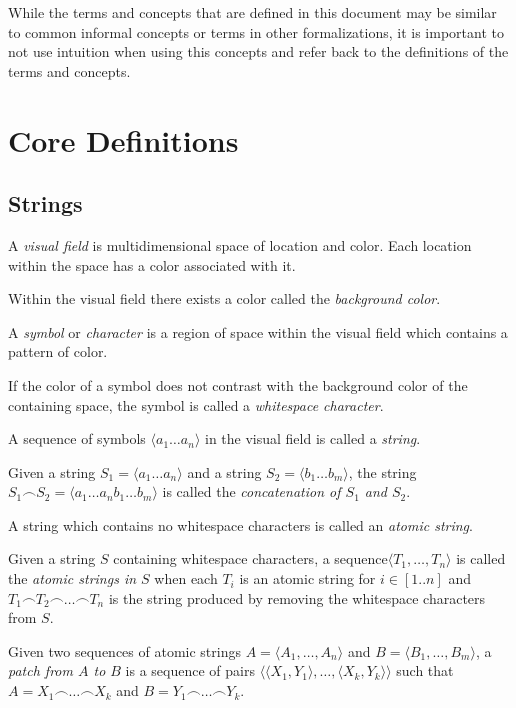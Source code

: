 \documentclass{article}
\newcommand{\nl}{\bigskip\noindent}
\newcommand{\seq}[1]{\langle #1\rangle}
\newcommand{\defcon}[1]{\emph{#1}}
\newcommand{\seqcat}{\frown}
\begin{document}
\nl While the terms and concepts that are defined in this document may be similar to common informal concepts or terms in other formalizations, it is important to not use intuition when using this concepts and refer back to the definitions of the terms and concepts. 

\section{Core Definitions}

\subsection{Strings}

\nl A \defcon{visual field} is multidimensional space of location and color.  Each location within the space has a color associated with it.  

\nl Within the visual field there exists a color called the \defcon{background color}.

\nl A \defcon{symbol} or \defcon{character} is a region of space within the visual field which contains a pattern of color.  

\nl If the color of a symbol does not contrast with the background color of the containing space, the symbol is called a \defcon{whitespace character}.  

\nl A sequence of symbols $\seq{a_1\dots a_n}$ in the visual field is called a \defcon{string}.

\nl Given a string $S_1= \seq{a_1\dots a_n}$ and a string $S_2 = \seq{b_1\dots b_m}$, the string $S_1\seqcat S_2 = \seq{a_1\dots a_nb_1\dots b_m}$ is called the \defcon{concatenation of $S_1$ and $S_2$}.



\nl A string which contains no whitespace characters is called an \defcon{atomic string}.


\nl Given a string $S$ containing whitespace characters, a sequence$\seq{T_1,\dots, T_n}$ is called the \defcon{atomic strings in $S$} when each $T_i$ is an atomic string for $i\in[1..n]$ and  $T_1\seqcat T_2\seqcat\dots \seqcat T_n$ is the string produced by removing the whitespace characters from $S$.


\nl Given two sequences of atomic strings $A = \seq{A_1,\dots, A_n}$ and $B = \seq{B_1,\dots, B_m}$, a \defcon{patch from $A$ to $B$} is a sequence of pairs $\seq{\seq{X_1,Y_1}, \dots, \seq{X_k, Y_k}}$ such that $A = X_1\seqcat\dots\seqcat X_k$ and $B = Y_1\seqcat\dots\seqcat Y_k$.  
\end{document}
